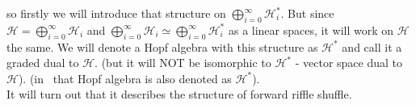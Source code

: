 \documentclass[a4paper]{article}
\begin{document}
so firstly we will introduce that structure on  
$\displaystyle\bigoplus^{\infty}_{i = 0} \mathcal{H}_i^*$. But since $\mathcal{H} = 
\displaystyle\bigoplus^{\infty}_{i = 0} \mathcal{H}_i$ and $\displaystyle\bigoplus^{\infty}_{i = 0}
\mathcal{H}_i \simeq \displaystyle\bigoplus^{\infty}_{i = 0} \mathcal{H}_i^*$ as a linear spaces, it will
work on $\mathcal{H}$ the same. We will denote a Hopf algebra with this structure 
as $\mathcal{H}^*$ and call it a graded dual to $\mathcal{H}$. (but it will NOT be isomorphic to 
$\mathcal{H}^*$ - vector space dual to $\mathcal{H}$). (in~\cite{Diaconis2014} that Hopf algebra is also 
denoted as $\mathcal{H}^*$).  \\
It will turn out that it describes the structure of forward riffle shuffle. \\
\end{document}

